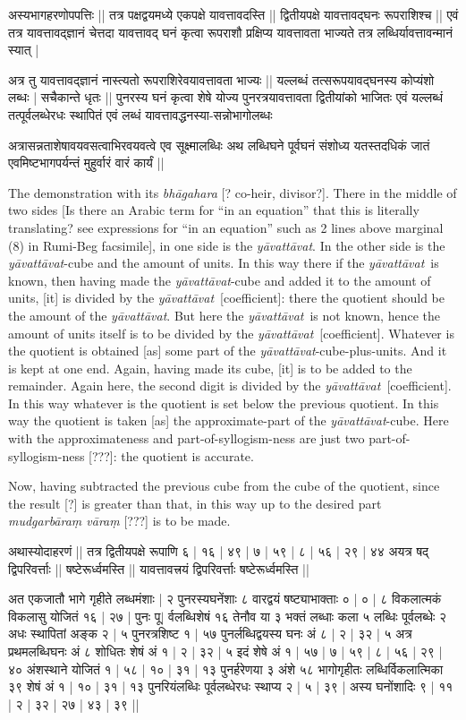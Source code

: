 \documentclass[12pt]{book}
\let\*=\d
\def\ya{\textit{y\=avat\-t\=avat}}
\begin{document}
\newpage

{\s अस्यभागहरणोपपत्तिः ||
तत्र पक्षद्वयमध्ये एकपक्षे यावत्तावदस्ति ||
द्वितीयपक्षे यावत्तावद्घनः रूपराशिश्च ||
एवं तत्र यावत्तावद्ज्ञानं चेत्तदा यावत्तावद् घनं कृत्वा
रूपराशौ प्रक्षिप्य यावत्तावता भाज्यते तत्र लब्धिर्यावत्तावन्मानं स्यात् |

अत्र तु यावत्तावद्ज्ञानं नास्त्यतो रूपराशिरेवयावत्तावता भाज्यः ||
यल्लब्धं तत्सरूपयावद्घनस्य कोप्यंशो लब्धः |
सचैकान्ते धृतः || पुनरस्य घनं कृत्वा शेषे
योज्य पुनरत्रयावत्तावता द्वितीयांको भाजितः एवं यल्लब्धं तत्पूर्वलब्धेरधः स्थापितं एवं लब्धं यावत्तावद्धनस्या-सन्नोभागोलब्धः

अत्रासन्नताशेषावयवसत्वाभिरवयवत्वे एव सूक्ष्मालब्धिः अथ लब्धिघने पूर्वघनं
संशोध्य यतस्तदधिकं जातं एवमिष्टभागपर्यन्तं मुहुर्वारं वारं कार्यं ||}

\newpage

The demonstration with its \textit{bh\=agahara} [? co-heir, divisor?]. There in 
the middle of two sides [Is there an Arabic term for ``in an equation'' that this
is literally translating?  see expressions for ``in an equation'' such as 2 lines
above marginal (8) in Rumi-Beg facsimile], in one side is the \ya. 
In the other side is the \ya-cube
and the amount of units. In this way there if the \ya\ is known, then having
made the \ya-cube and added it to the amount of units, [it] is divided by 
the \ya\ [coefficient]:  there the quotient should be the amount of the \ya. But here the
\ya\ is not known, hence the amount of units itself is to be divided by the \ya\
[coefficient]. 
Whatever is the quotient is obtained [as] some part of the \ya-cube-plus-units.
And it is kept at one end. Again, having made its cube, [it] is to be added
to the remainder. Again here, the second digit is divided by the \ya\ [coefficient]. In this way
whatever is the quotient is set below the previous quotient. In this way
the quotient is taken [as] the approximate-part of the \ya-cube. Here with the 
approximateness and part-of-syllogism-ness are just two part-of-syllogism-ness [???]:
the quotient is accurate. 

Now, having subtracted the previous cube from the cube of the quotient, since
the result [?] is greater than that, in this way up to the desired part 
\textit{mudgarb\=ara\*m v\=ara\*m} [???] is to be made.

\newpage

{\s अथास्योदाहरणं ||
तत्र द्वितीयपक्षे रूपाणि ६ | १६ | ४९ | ७ | ५९ | ८ | ५६ | २९ | ४४ अयत्र षद्
द्विपरिवर्त्ताः ||
षष्टेरूर्ध्वमस्ति ||
यावत्तावत्त्रयं द्विपरिवर्त्ताः षष्टेरूर्ध्वमस्ति ||

अत एकजातौ भागे गृहीते लब्धमंशाः | २ पुनरस्यघनेंशाः ८ वारद्वयं षष्ट्याभाक्ताः ० |
० | ८ विकलात्मकं विकलासु योजितं १६ | २७ | पुनः पू$|$\marginnote{f.~4v J}%
र्वलब्धिशेषं १६
तेनौव या ३ भक्तं लब्धाः कला ५ लब्धिः पूर्वलब्धेः २ अधः स्थापितां अङ्क २ | ५
पुनरत्रशिष्ट १ | ५७ पुनर्लब्धिद्वयस्य घनः अं ८ | २ | ३२ | ५
अत्र प्रथमलब्धिघनः अं ८
शोधितः शेषं अं १ | २ | ३२ | ५ इदं शेषे अं १ | ५७ | ७ | ५९ | ८ | ५६ | २९ | ४० अंशस्थाने योजितं
१ | ५८ | १० | ३१ | १३ पुनर्हरेणया ३ अंशे ५८ भागोगृहीतः लब्धिर्विकलात्मिका ३९ शेषं अं १ | १० | ३१ | १३ पुनरियंलब्धिः पूर्वलब्धेरधः स्थाप्य २ | ५ |
३९ | अस्य घनोंशादिः ९ | ११ | २ | ३२ | २७ | ४३ | ३९ || }
\end{document}
